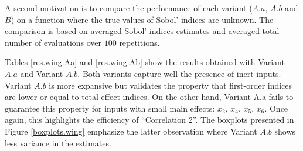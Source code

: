 {A second motivation is to compare the performance of each variant ($A.a$, $A.b$ and $B$) on a function where the true values of Sobol' indices are unknown. The comparison is based on averaged Sobol' indices estimates and averaged total number of evaluations over $100$ repetitions.
\bigskip


Tables \ref{res.wing.Aa} and \ref{res.wing.Ab} show the results obtained with Variant $A.a$ and  Variant $A.b$. Both variants capture well the presence of inert inputs. Variant $A.b$ is more expansive but validates the property that first-order indices are lower or equal to total-effect indices. On the other hand, Variant A.a fails to guarantee this property for inputs with small main effects: $x_2$, $x_4$, $x_5$, $x_6$. Once again, this highlights the efficiency of ``Correlation 2''. The boxplots presented in Figure \ref{boxplots.wing} emphasize the latter observation where Variant $A.b$ shows less variance in the estimates. 

}

